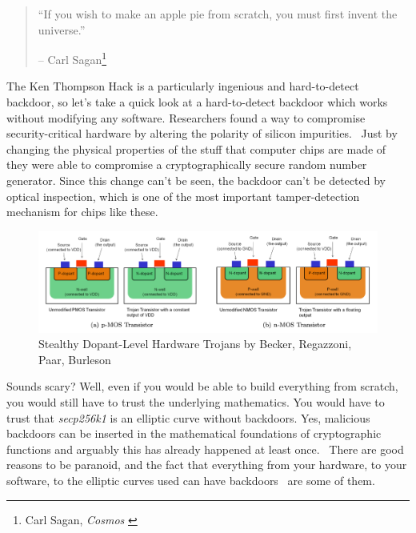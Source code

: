 \begin{quotation}\begin{samepage}
\enquote{If you wish to make an apple pie from scratch, you must first invent
the universe.}
\begin{flushright} -- Carl Sagan\footnote{Carl Sagan, \textit{Cosmos} \cite{cosmos}}
\end{flushright}\end{samepage}\end{quotation}

The Ken Thompson Hack is a particularly ingenious and hard-to-detect backdoor,
so let's take a quick look at a hard-to-detect backdoor which works without
modifying any software. Researchers found a way to compromise security-critical
hardware by altering the polarity of silicon
impurities.~\cite{becker2013stealthy} Just by changing the physical properties
of the stuff that computer chips are made of they were able to compromise a
cryptographically secure random number generator. Since this change can't be
seen, the backdoor can't be detected by optical inspection, which is one of the
most important tamper-detection mechanism for chips like these.

\begin{figure}
  \includegraphics{assets/images/stealthy-hardware-trojan.png}
  \caption{Stealthy Dopant-Level Hardware Trojans by Becker, Regazzoni, Paar, Burleson}
  \label{fig:stealthy-hardware-trojan}
\end{figure}

Sounds scary? Well, even if you would be able to build everything from
scratch, you would still have to trust the underlying mathematics. You
would have to trust that \textit{secp256k1} is an elliptic curve without
backdoors. Yes, malicious backdoors can be inserted in the mathematical
foundations of cryptographic functions and arguably this has already
happened at least once.~\cite{wiki:Dual_EC_DRBG} There are good reasons to be paranoid, and the
fact that everything from your hardware, to your software, to the
elliptic curves used can have backdoors~\cite{wiki:backdoors} are some of them.

